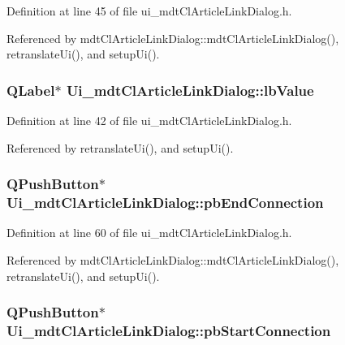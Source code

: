 Definition at line 45 of file ui\-\_\-mdt\-Cl\-Article\-Link\-Dialog.\-h.



Referenced by mdt\-Cl\-Article\-Link\-Dialog\-::mdt\-Cl\-Article\-Link\-Dialog(), retranslate\-Ui(), and setup\-Ui().

\hypertarget{class_ui__mdt_cl_article_link_dialog_a92ce984726af591160d5db71ff81e906}{
\subsubsection[{lb\-Value}]{\setlength{\rightskip}{0pt plus 5cm}Q\-Label$\ast$ Ui\-\_\-mdt\-Cl\-Article\-Link\-Dialog\-::lb\-Value}}\label{class_ui__mdt_cl_article_link_dialog_a92ce984726af591160d5db71ff81e906}


Definition at line 42 of file ui\-\_\-mdt\-Cl\-Article\-Link\-Dialog.\-h.



Referenced by retranslate\-Ui(), and setup\-Ui().

\hypertarget{class_ui__mdt_cl_article_link_dialog_ad917ee21faf606b8de07a303cd35c595}{
\subsubsection[{pb\-End\-Connection}]{\setlength{\rightskip}{0pt plus 5cm}Q\-Push\-Button$\ast$ Ui\-\_\-mdt\-Cl\-Article\-Link\-Dialog\-::pb\-End\-Connection}}\label{class_ui__mdt_cl_article_link_dialog_ad917ee21faf606b8de07a303cd35c595}


Definition at line 60 of file ui\-\_\-mdt\-Cl\-Article\-Link\-Dialog.\-h.



Referenced by mdt\-Cl\-Article\-Link\-Dialog\-::mdt\-Cl\-Article\-Link\-Dialog(), retranslate\-Ui(), and setup\-Ui().

\hypertarget{class_ui__mdt_cl_article_link_dialog_aebe10d3a87978da5ba9595889e6df946}{
\subsubsection[{pb\-Start\-Connection}]{\setlength{\rightskip}{0pt plus 5cm}Q\-Push\-Button$\ast$ Ui\-\_\-mdt\-Cl\-Article\-Link\-Dialog\-::pb\-Start\-Connection}}\label{class_ui__mdt_cl_article_link_dialog_aebe10d3a87978da5ba9595889e6df946}


